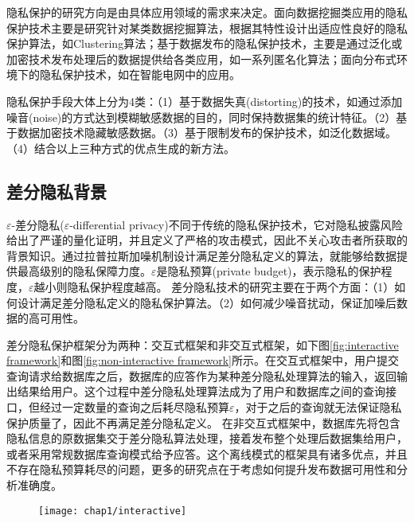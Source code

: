 隐私保护的研究方向是由具体应用领域的需求来决定。面向数据挖掘类应用的隐私保护技术主要是研究针对某类数据挖掘算法，根据其特性设计出适应性良好的隐私保护算法，如Clustering\cite{clustering}算法；基于数据发布的隐私保护技术，主要是通过泛化或加密技术发布处理后的数据提供给各类应用，如一系列匿名化算法\cite{multidimensional k anonymity}；面向分布式环境下的隐私保护技术，如在智能电网中的应用\cite{Distributed Privacy}。

隐私保护手段大体上分为4类\cite{面向数据库应用的隐私保护研究综述}：（1）基于数据失真(distorting)的技术，如通过添加噪音(noise)的方式达到模糊敏感数据的目的，同时保持数据集的统计特征。（2）基于数据加密技术隐藏敏感数据。（3）基于限制发布的保护技术，如泛化数据域。（4）结合以上三种方式的优点生成的新方法。


\subsection{差分隐私背景} %

$\varepsilon$-差分隐私($\varepsilon$-differential privacy)\cite{Dwork Calibrating}不同于传统的隐私保护技术，它对隐私披露风险给出了严谨的量化证明，并且定义了严格的攻击模式，因此不关心攻击者所获取的背景知识。通过拉普拉斯加噪机制\cite{Dwork Calibrating}设计满足差分隐私定义的算法，就能够给数据提供最高级别的隐私保障力度。$\varepsilon$是隐私预算(private budget)，表示隐私的保护程度，$\varepsilon$越小则隐私保护程度越高。
差分隐私技术的研究主要在于两个方面：（1）如何设计满足差分隐私定义的隐私保护算法。（2）如何减少噪音扰动，保证加噪后数据的高可用性。

差分隐私保护框架分为两种：交互式框架和非交互式框架，如下图\ref{fig:interactive framework}和图\ref{fig:non-interactive framework}所示。在交互式框架中，用户提交查询请求给数据库之后，数据库的应答作为某种差分隐私处理算法的输入，返回输出结果给用户。这个过程中差分隐私处理算法成为了用户和数据库之间的查询接口，但经过一定数量的查询之后耗尽隐私预算$\varepsilon$，对于之后的查询就无法保证隐私保护质量了，因此不再满足差分隐私定义。
在非交互式框架中，数据库先将包含隐私信息的原数据集交于差分隐私算法处理，接着发布整个处理后数据集给用户，或者采用常规数据库查询模式给予应答。这个离线模式的框架具有诸多优点，并且不存在隐私预算耗尽的问题，更多的研究点在于考虑如何提升发布数据可用性和分析准确度。

\begin{figure}[!htp]
	\centering
	\texttt{[image: chap1/interactive]}
\end{figure}

